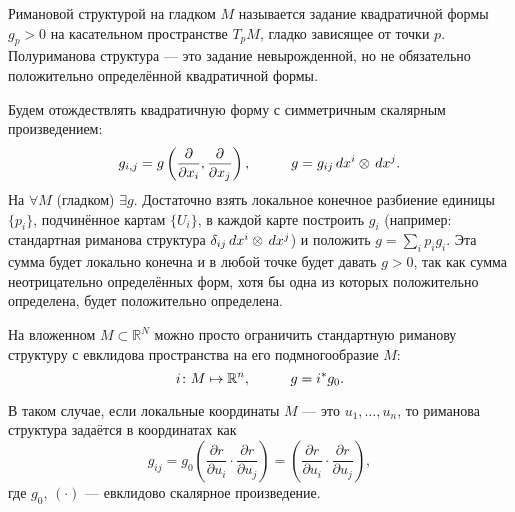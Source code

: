 \begin{to_def}
	Римановой структурой на гладком $M$ называется задание квадратичной формы $g_p >0$ на касательном пространстве $T_p M$, гладко зависящее от точки $p$. Полуриманова структура --- это задание невырожденной, но не обязательно положительно определённой квадратичной формы.
\end{to_def}

Будем отождествлять квадратичную форму с симметричным скалярным произведением:
\begin{equation*}
	g_{i,j} = g \left(\frac{\partial}{\partial x_i}, \frac{\partial}{\partial x_j}\right),
	\hspace*{1 cm}
	g = g_{i j} \, d x^i \otimes \, d x^j.
\end{equation*}
На $\forall M$ (гладком) $\exists g$. Достаточно взять локальное конечное разбиение единицы $\{p_i\}$, подчинённое картам $\{U_i\}$, в каждой карте построить $g_i$ (например: стандартная риманова структура $\delta_{i j} \, d x^i \otimes \, d x^j $) и положить $g = \sum_i p_i g_i$.
Эта сумма будет локально конечна и в любой точке будет давать $g>0$, так как сумма неотрицательно определённых форм, хотя бы одна из которых положительно определена, будет положительно определена.

На вложенном $M \subset \mathbb{R}^N$ можно просто ограничить стандартную риманову структуру с евклидова пространства на его подмногообразие $M$:
\begin{equation*}
	 i\colon M \mapsto \mathbb{R}^n, \hspace*{1 cm}  
	 g = i^* g_0.
\end{equation*}

В таком случае, если локальные координаты $M$ --- это $u_{1}, \ldots, u_n $, то риманова структура задаётся в координатах как
\begin{equation}
	g_{i j} = g_0\left(\frac{\partial r}{\partial u_i} \cdot \frac{\partial r}{\partial u_j}\right) = \left(\frac{\partial r}{\partial u_i} \cdot \frac{\partial r}{\partial u_j}\right),	
\end{equation}
где $g_{0}$, $(\cdot)$ --- евклидово скалярное произведение.
